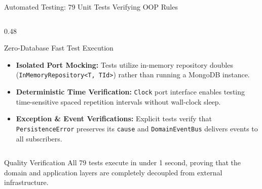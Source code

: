 ﻿\documentclass[aspectratio=169,10pt,t]{beamer}
\begin{document}
\begin{frame}{Automated Testing: 79 Unit Tests Verifying OOP Rules}
\begin{columns}[T,onlytextwidth]
    \begin{column}{0.48\textwidth}
      \begin{infoCard}{Zero-Database Fast Test Execution}
        \begin{itemize}\setlength{\itemsep}{1.2pt}\setlength{\parskip}{0pt}\setlength{\leftmargini}{8pt}
          \item \textbf{Isolated Port Mocking:} Tests utilize in-memory repository doubles (\texttt{InMemoryRepository<T, TId>}) rather than running a MongoDB instance.
          \item \textbf{Deterministic Time Verification:} \texttt{Clock} port interface enables testing time-sensitive spaced repetition intervals without wall-clock sleep.
          \item \textbf{Exception \& Event Verifications:} Explicit tests verify that \texttt{PersistenceError} preserves its \texttt{cause} and \texttt{DomainEventBus} delivers events to all subscribers.
        \end{itemize}
      \end{infoCard}
    \end{column}
  \end{columns}

  \vspace{1.2mm}
  \begin{hlCard}{Quality Verification}
    All 79 tests execute in under 1 second, proving that the domain and application layers are completely decoupled from external infrastructure.
  \end{hlCard}
\end{frame}
\end{document}
